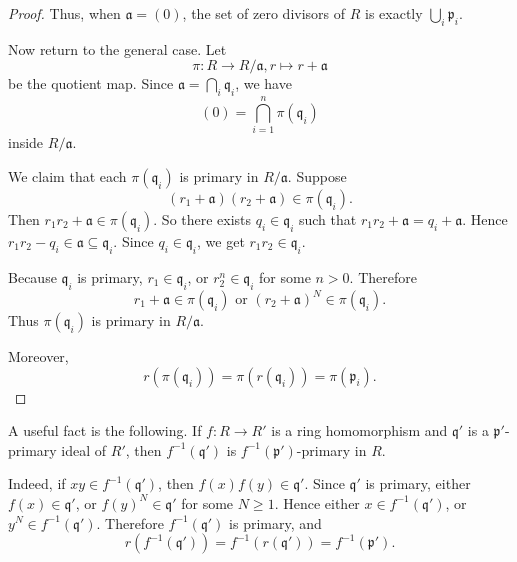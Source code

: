 \begin{proof}
Thus, when \(\mathfrak a=(0)\), the set of zero divisors of \(R\) is exactly \(\bigcup_i\mathfrak p_i\).

Now return to the general case. Let
\[
    \pi:R\to R/\mathfrak a, r\mapsto r+\mathfrak a
\]
be the quotient map. Since \(\mathfrak a=\bigcap_i\mathfrak q_i\), we have
\[
    (0)=\bigcap_{i=1}^n \pi(\mathfrak q_i)
\]
inside \(R/\mathfrak a\).

We claim that each \(\pi(\mathfrak q_i)\) is primary in \(R/\mathfrak a\). Suppose
\[
    (r_1+\mathfrak a)(r_2+\mathfrak a)\in \pi(\mathfrak q_i).
\]
Then \(r_1r_2+\mathfrak a\in\pi(\mathfrak q_i)\). So there exists \(q_i\in\mathfrak q_i\) such that \(r_1r_2+\mathfrak a=q_i+\mathfrak a\). Hence \(r_1r_2-q_i\in\mathfrak a\subseteq\mathfrak q_i\). Since \(q_i\in\mathfrak q_i\), we get \(r_1r_2\in\mathfrak q_i\).

Because \(\mathfrak q_i\) is primary, \(r_1\in\mathfrak q_i\), or \(r_2^n\in\mathfrak q_i\) for some \(n > 0\). Therefore
\[
  r_1+\mathfrak a\in\pi(\mathfrak q_i) \text{ or }
    (r_2+\mathfrak a)^N\in\pi(\mathfrak q_i).
\]
Thus \(\pi(\mathfrak q_i)\) is primary in \(R/\mathfrak a\).

Moreover,
\[
    r(\pi(\mathfrak q_i))
    =
    \pi(r(\mathfrak q_i))
    =
    \pi(\mathfrak p_i).
\]
%
%
\end{proof}

\begin{remark}
A useful fact is the following. If \(f:R\to R'\) is a ring homomorphism and \(\mathfrak q'\) is a \(\mathfrak p'\)-primary ideal of \(R'\), then \(f^{-1}(\mathfrak q')\) is \(f^{-1}(\mathfrak p')\)-primary in \(R\).

Indeed, if \(xy\in f^{-1}(\mathfrak q')\), then \(f(x)f(y)\in\mathfrak q'\). Since \(\mathfrak q'\) is primary, either \(f(x)\in\mathfrak q'\), or \(f(y)^N\in\mathfrak q'\) for some \(N\geq 1\). Hence either \(x\in f^{-1}(\mathfrak q')\), or \(y^N\in f^{-1}(\mathfrak q')\). Therefore \(f^{-1}(\mathfrak q')\) is primary, and
\[
    r(f^{-1}(\mathfrak q'))
    =
    f^{-1}(r(\mathfrak q'))
    =
    f^{-1}(\mathfrak p').
\]
\end{remark}

